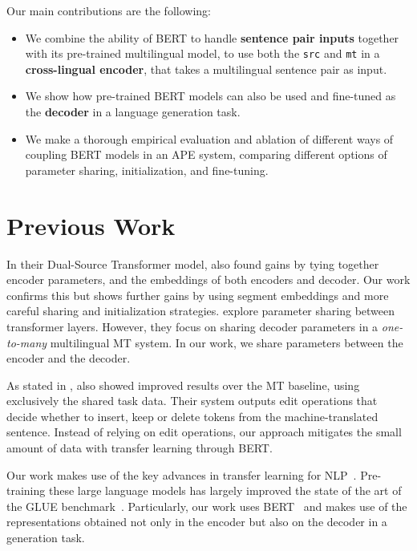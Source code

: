 Our main contributions are the following:
\begin{itemize}
    \item We combine the ability of BERT to
          handle {\bf sentence pair inputs} together with its pre-trained
          multilingual model, to use both the {\tt src} and {\tt mt} in a
              {\bf cross-lingual encoder}, that takes a multilingual
          sentence pair as input.
    \item We show how pre-trained BERT models can also be used and
          fine-tuned as the {\bf decoder} in a language generation task.
    \item We make a thorough empirical evaluation and ablation of different ways of
          coupling BERT models in an APE system, comparing different options
          of parameter sharing, initialization, and fine-tuning.
\end{itemize}

\section{Previous Work}

\noindent In their Dual-Source Transformer model, \citet{junczys2018ms} also
found gains by tying together encoder parameters, and the embeddings
of both encoders and decoder. Our work confirms this but shows
further gains by using segment embeddings and more careful sharing
and initialization strategies. \citet{sachan2018parameter} explore
parameter sharing between transformer layers. However, they focus on
sharing decoder parameters in a \emph{one-to-many} multilingual MT
system. In our work, we share parameters between the encoder and the
decoder.

As stated in , \citet{berard2017lig} also
showed improved results over the MT baseline, using exclusively the
shared task data. Their system outputs edit operations that decide
whether to insert, keep or delete tokens from the machine-translated
sentence. Instead of relying on edit operations, our approach
mitigates the small amount of data with transfer learning through
BERT.

Our work makes use of the key advances in transfer learning for
NLP~\citep{peters2018deep, howard2018universal, radford2018improving,
    devlin2018bert}. Pre-training these large language models has largely
improved the state of the art of the GLUE
benchmark~\citep{wang2018glue}. Particularly, our work uses
BERT~\citep{devlin2018bert} and makes use of the representations
obtained not only in the encoder but also on the decoder in a
generation task.


